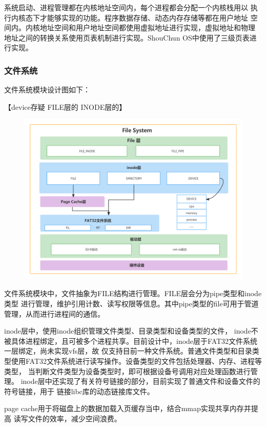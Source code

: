 \documentclass[UTF8,a4paper,10pt]{ctexart}
\begin{document}
系统启动、进程管理都在内核地址空间内，每个进程都会分配一个内核栈用以
执行内核态下才能够实现的功能。程序数据存储、动态内存存储等都在用户地址
空间内。内核地址空间和用户地址空间都使用虚拟地址进行实现，虚拟地址和物理
地址之间的转换关系使用页表机制进行实现。ShouChun OS中使用了三级页表进行实现。

\subsubsection{文件系统}

文件系统模块设计图如下：

【device存疑 FILE层的 INODE层的】

\begin{figure}[H]
  \centering
  \includegraphics[scale=0.15]{image/img03.png}
\end{figure}

文件系统模块中，文件抽象为FILE结构进行管理。FILE层会分为pipe类型和inode类型
进行管理，维护引用计数、读写权限等信息。其中pipe类型的file可用于管道管理，从而进行进程间的通信。

inode层中，使用inode组织管理文件类型、目录类型和设备类型的文件，
inode不被具体进程绑定，且可被多个进程共享。目前设计中，inode层于FAT32文件系统一层绑定，尚未实现vfs层，故
仅支持目前一种文件系统。普通文件类型和目录类型使用FAT32文件系统进行读写操作。设备类型的文件包括处理器、内存、进程等类型，
当判断文件类型为设备类型时，即可根据设备号调用对应处理函数进行管理。
inode层中还实现了有关符号链接的部分，目前实现了普通文件和设备文件的符号链接，用于
链接libc库的动态链接库文件。

page cache用于将磁盘上的数据加载入页缓存当中，结合mmap实现共享内存并提高
读写文件的效率，减少空间浪费。
\end{document}
